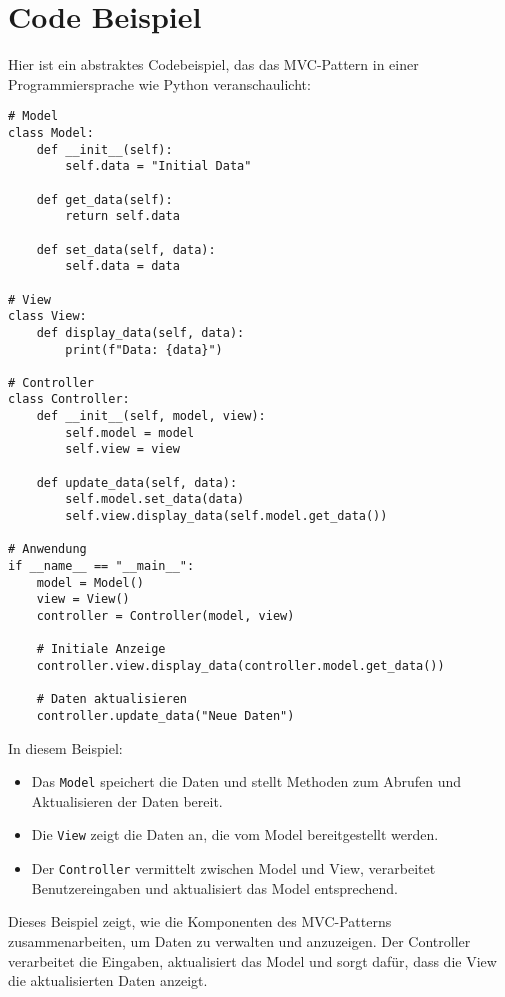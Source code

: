 \section{Code Beispiel}

Hier ist ein abstraktes Codebeispiel, das das MVC-Pattern in einer Programmiersprache wie Python veranschaulicht:

\begin{verbatim}
# Model
class Model:
    def __init__(self):
        self.data = "Initial Data"

    def get_data(self):
        return self.data

    def set_data(self, data):
        self.data = data

# View
class View:
    def display_data(self, data):
        print(f"Data: {data}")

# Controller
class Controller:
    def __init__(self, model, view):
        self.model = model
        self.view = view

    def update_data(self, data):
        self.model.set_data(data)
        self.view.display_data(self.model.get_data())

# Anwendung
if __name__ == "__main__":
    model = Model()
    view = View()
    controller = Controller(model, view)

    # Initiale Anzeige
    controller.view.display_data(controller.model.get_data())

    # Daten aktualisieren
    controller.update_data("Neue Daten")
\end{verbatim}

In diesem Beispiel:
\begin{itemize}
    \item Das \texttt{Model} speichert die Daten und stellt Methoden zum Abrufen und Aktualisieren der Daten bereit.
    \item Die \texttt{View} zeigt die Daten an, die vom Model bereitgestellt werden.
    \item Der \texttt{Controller} vermittelt zwischen Model und View, verarbeitet Benutzereingaben und aktualisiert das Model entsprechend.
\end{itemize}

Dieses Beispiel zeigt, wie die Komponenten des MVC-Patterns zusammenarbeiten, um Daten zu verwalten und anzuzeigen. Der Controller verarbeitet die Eingaben, aktualisiert das Model und sorgt dafür, dass die View die aktualisierten Daten anzeigt.